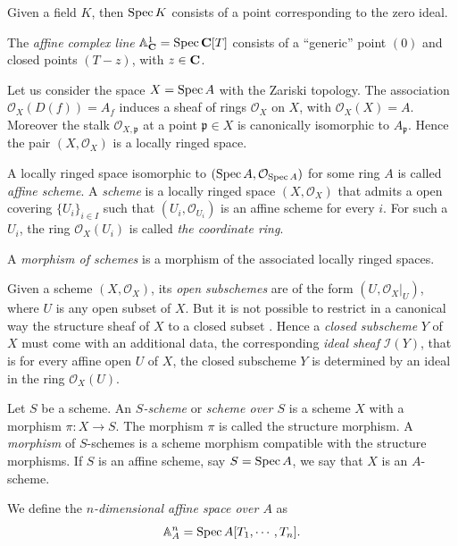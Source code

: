 \documentclass[a4paper,openany]{scrbook}
\begin{document}
\begin{example}
 Given a field $K$, then $\operatorname{Spec} K$ consists of a point corresponding to the zero ideal.

 The \emph{affine complex line} $\mathbb A_\mathbf C^1=\operatorname{Spec} \mathbf C[T]$ consists of a ``generic'' point $(0)$ and closed points $(T-z)$, with $z\in \mathbf C$.
\end{example}
Let us consider the space $X = \operatorname{Spec} A$ with the Zariski topology. The association $\mathcal O_X(D(f))=A_f$ induces a sheaf of rings $\mathcal O_X$ on $X$, with $\mathcal O_X(X)=A$. Moreover the stalk $\mathcal O_{X,\mathfrak p}$ at a point $\mathfrak p\in X$ is canonically isomorphic to $A_\mathfrak p$. Hence the pair $(X,\mathcal O_X)$ is a locally ringed space.
\begin{defn} 
 A locally ringed space isomorphic to $(\operatorname{Spec} A,\mathcal O_{\operatorname{Spec} A})$ for some ring $A$ is called \emph{affine scheme}. A \emph{scheme} is a locally ringed space $(X,\mathcal O_X)$ that admits a open covering $\{U_i\}_{i\in I}$ such that $(U_i,\mathcal O_{U_i})$ is an affine scheme for every $i$. For such a $U_i$, the ring $\mathcal O_X(U_i)$ is called \emph{the coordinate ring}.

 A \emph{morphism of schemes} is a morphism of the associated locally ringed spaces.
\end{defn}

Given a scheme $(X,\mathcal O_X)$, its \emph{open subschemes} are of the form $(U,\mathcal O_X|_U)$, where $U$ is any open subset of $X$. But it is not possible to restrict in a canonical way the structure sheaf of $X$ to a closed subset . Hence a \emph{closed subscheme} $Y$ of $X$ must come with an additional data, the corresponding \emph{ideal sheaf} $\mathcal I(Y)$, that is for every affine open $U$ of $X$, the closed subscheme $Y$ is determined by an ideal in the ring $\mathcal O_X(U)$.

\begin{defn}
 Let $S$ be a scheme. An \emph{$S$-scheme} or \emph{scheme over $S$} is a scheme $X$ with a morphism $\pi:X\to S$. The morphism $\pi$ is called the structure morphism. A \emph{morphism} of $S$-schemes is a scheme morphism compatible with the structure morphisms. If $S$ is an affine scheme, say $S=\operatorname{Spec} A$, we say that $X$ is an $A$-scheme. 
\end{defn}

\begin{example}
 We define the \emph{$n$-dimensional affine space over $A$} as
 \[
 \mathbb A^n_A = \operatorname{Spec} A[T_1,\cdots,T_n].
 \]
\end{example}
\end{document}
